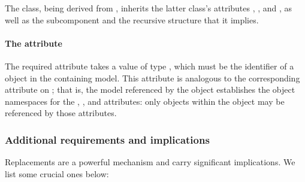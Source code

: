 The \ReplacedBy class, being derived from \SBaseRef, inherits the latter class's attributes , ,  and , as well as the subcomponent  and the recursive structure that it implies.  


\paragraph{The \fixttspace{} attribute}
\label{replacedby-submodelref}

The required attribute  takes a value of type , which must be the identifier of a \Submodel object in the containing model.  This attribute is analogous to the corresponding attribute on \ReplacedElement; that is, the model referenced by the \Submodel object establishes the object namespaces for the , ,  and  attributes: only objects within the \Model object may be referenced by those attributes.


\subsubsection{Additional requirements and implications}
\label{replacedelement-additional}

Replacements are a powerful mechanism and carry significant implications.  We list some crucial ones below:

